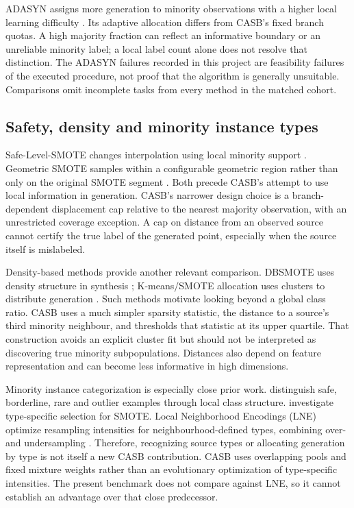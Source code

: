 \documentclass[conference]{IEEEtran}
\begin{document}
ADASYN assigns more generation to minority observations with a higher local learning difficulty \citep{he2008}. Its adaptive allocation differs from CASB's fixed branch quotas. A high majority fraction can reflect an informative boundary or an unreliable minority label; a local label count alone does not resolve that distinction. The ADASYN failures recorded in this project are feasibility failures of the executed procedure, not proof that the algorithm is generally unsuitable. Comparisons omit incomplete tasks from every method in the matched cohort.

\subsection{Safety, density and minority instance types}
Safe-Level-SMOTE changes interpolation using local minority support \citep{safe2009}. Geometric SMOTE samples within a configurable geometric region rather than only on the original SMOTE segment \citep{geometric2019}. Both precede CASB's attempt to use local information in generation. CASB's narrower design choice is a branch-dependent displacement cap relative to the nearest majority observation, with an unrestricted coverage exception. A cap on distance from an observed source cannot certify the true label of the generated point, especially when the source itself is mislabeled.

Density-based methods provide another relevant comparison. DBSMOTE uses density structure in synthesis \citep{dbsmote}; K-means/SMOTE allocation uses clusters to distribute generation \citep{kmeans}. Such methods motivate looking beyond a global class ratio. CASB uses a much simpler sparsity statistic, the distance to a source's third minority neighbour, and thresholds that statistic at its upper quartile. That construction avoids an explicit cluster fit but should not be interpreted as discovering true minority subpopulations. Distances also depend on feature representation and can become less informative in high dimensions.

Minority instance categorization is especially close prior work. \citet{napierala2016} distinguish safe, borderline, rare and outlier examples through local class structure. \citet{skryjomski2017} investigate type-specific selection for SMOTE. Local Neighborhood Encodings (LNE) optimize resampling intensities for neighbourhood-defined types, combining over- and undersampling \citep{lne2024}. Therefore, recognizing source types or allocating generation by type is not itself a new CASB contribution. CASB uses overlapping pools and fixed mixture weights rather than an evolutionary optimization of type-specific intensities. The present benchmark does not compare against LNE, so it cannot establish an advantage over that close predecessor.
\end{document}
